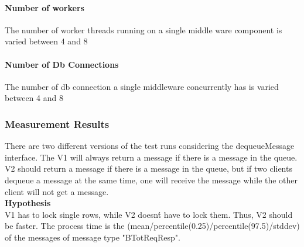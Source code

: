 \documentclass[milestone1.tex]{subfiles}
\begin{document}
\paragraph{Number of workers}

The number of worker threads running on a single middle ware component is varied between 4 and 8

\paragraph{Number of Db Connections}

The number of db connection a single middleware concurrently has is varied between 4 and 8

\subsubsection{Measurement Results}

There are two different versions of the test runs considering the dequeueMessage interface. The V1 will always return a message if there is a message in the queue. V2 should return a message if there is a message in the queue, but if two clients dequeue a message at the same time, one will receive the message while the other client will not get a message.\\

\textbf{Hypothesis}\\

V1 has to lock single rows, while V2 doesn\'t have to lock them. Thus, V2 should be faster. The process time is the (mean/percentile(0.25)/percentile(97.5)/stddev) of the messages of message type "BTotReqResp".\\
\end{document}

